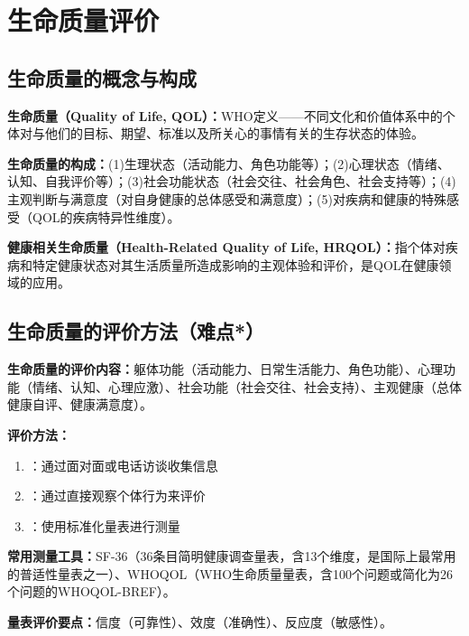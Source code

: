 \chapter{生命质量评价}
\setcounter{chapter}{12}

\section{生命质量的概念与构成}

\begin{defbox}
\textbf{生命质量（Quality of Life, QOL）：}WHO定义——不同文化和价值体系中的个体对与他们的目标、期望、标准以及所关心的事情有关的生存状态的体验。

\textbf{生命质量的构成：}(1)生理状态（活动能力、角色功能等）；(2)心理状态（情绪、认知、自我评价等）；(3)社会功能状态（社会交往、社会角色、社会支持等）；(4)主观判断与满意度（对自身健康的总体感受和满意度）；(5)对疾病和健康的特殊感受（QOL的疾病特异性维度）。

\textbf{健康相关生命质量（Health-Related Quality of Life, HRQOL）：}指个体对疾病和特定健康状态对其生活质量所造成影响的主观体验和评价，是QOL在健康领域的应用。
\end{defbox}

\section{生命质量的评价方法（难点*）}

\begin{keybox}
\textbf{生命质量的评价内容：}躯体功能（活动能力、日常生活能力、角色功能）、心理功能（情绪、认知、心理应激）、社会功能（社会交往、社会支持）、主观健康（总体健康自评、健康满意度）。

\textbf{评价方法：}
\begin{enumerate}[leftmargin=*]
    \item {}：通过面对面或电话访谈收集信息
    \item {}：通过直接观察个体行为来评价
    \item {}：使用标准化量表进行测量
\end{enumerate}

\textbf{常用测量工具：}SF-36（36条目简明健康调查量表，含13个维度，是国际上最常用的普适性量表之一）、WHOQOL（WHO生命质量量表，含100个问题或简化为26个问题的WHOQOL-BREF）。

\textbf{量表评价要点：}信度（可靠性）、效度（准确性）、反应度（敏感性）。
\end{keybox}

